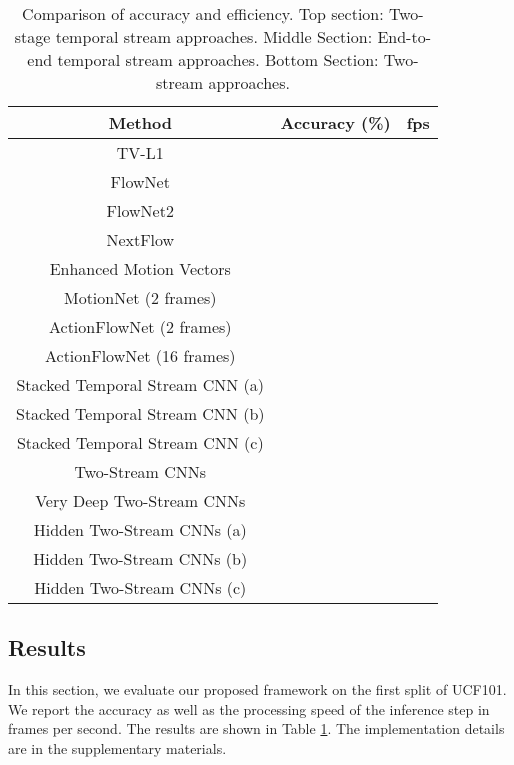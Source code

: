 \documentclass[runningheads]{llncs}
\begin{document}
		\begin{table}[t]
			\begin{center}\caption{Comparison of accuracy and efficiency.
					Top section: Two-stage temporal stream approaches.  
					Middle Section: End-to-end temporal stream approaches.  
					Bottom Section: Two-stream approaches. \label{tab:unsup_results}}
\begin{tabular}{  c | c | c  }
						\hline
						Method										&    Accuracy (\%)  &    fps \\
						\hline		
						\hline
						TV-L1 \cite{TVL1realTime}							&      &     \\		
						FlowNet \cite{flownet}							&      &     \\		
						FlowNet2 \cite{flownet2}					&      &     \\
						NextFlow \cite{nextflow_16}					&      &     \\
						Enhanced Motion Vectors \cite{EMV_cvpr16}			&      &     \\	
						MotionNet (2 frames)				&      &     \\		
						\hline
						\hline
						ActionFlowNet (2 frames)\cite{actionflownet_16}			&    	&    \\	ActionFlowNet (16 frames)\cite{actionflownet_16}		&    	&    \\	Stacked Temporal Stream CNN (a)	    					&    	&    \\	Stacked Temporal Stream CNN (b)     					&    	&    \\	
						Stacked Temporal Stream CNN (c)    					&    	&    \\	\hline
						\hline
Two-Stream CNNs \cite{twostream2014}				&    	&    \\	Very Deep Two-Stream CNNs\cite{wanggoodpractice2015}				&    	&    \\	Hidden Two-Stream CNNs (a)    					&    	&    \\	Hidden Two-Stream CNNs (b)    					&    	&    \\	Hidden Two-Stream CNNs (c)    					&    	&    \\	\hline
					\end{tabular}
\end{center}
		\end{table} 
		
		\subsection{Results}
		\label{sec:results}
		In this section, we evaluate our proposed framework on the first split of UCF101. We report the accuracy as well as the processing speed of the inference step in frames per second. The results are shown in Table \ref{tab:unsup_results}. The implementation details are in the supplementary materials.
		
\end{document}
